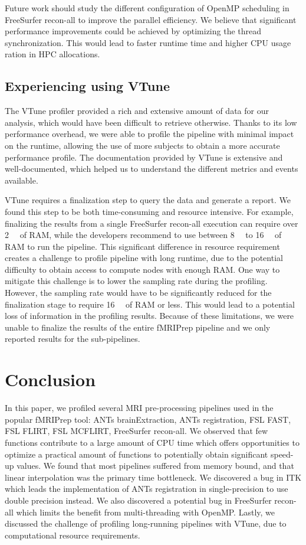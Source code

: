 \documentclass[conference]{IEEEtran}
\begin{document}
Future work should study the different configuration of OpenMP scheduling in FreeSurfer recon-all to improve the parallel efficiency. We believe that significant performance improvements could be achieved by optimizing the thread synchronization. This would lead to faster runtime time and higher CPU usage ration in HPC allocations.

\subsection{Experiencing using VTune}
The VTune profiler provided a rich and extensive amount of data for our analysis, which would have been difficult to retrieve otherwise. Thanks to its low performance overhead, we were able to profile the pipeline with minimal impact on the runtime, allowing the use of more subjects to obtain a more accurate performance profile. The documentation provided by VTune is extensive and well-documented, which helped us to understand the different metrics and events available.

VTune requires a finalization step to query the data and generate a report. We found this step to be both time-consuming and resource intensive. For example, finalizing the results from a single FreeSurfer recon-all execution can require over \SI{2}{\tera\byte} of RAM, while the developers recommend to use between \SI{8}{\giga\byte} to \SI{16}{\giga\byte} of RAM to run the pipeline. This significant difference in resource requirement creates a challenge to profile pipeline with long runtime, due to the potential difficulty to obtain access to compute nodes with enough RAM. One way to mitigate this challenge is to lower the sampling rate during the profiling. However, the sampling rate would have to be significantly reduced for the finalization stage to require  \SI{16}{\giga\byte} of RAM or less. This would lead to a potential loss of information in the profiling results.
Because of these limitations, we were unable to finalize the results of the entire fMRIPrep pipeline and we only reported results for the sub-pipelines.

\section{Conclusion}
In this paper, we profiled several MRI pre-processing pipelines used in the popular fMRIPrep tool: ANTs brainExtraction, ANTs registration, FSL FAST, FSL FLIRT, FSL MCFLIRT, FreeSurfer recon-all. We observed that few functions contribute to a large amount of CPU time which offers opportunities to optimize a practical amount of functions to potentially obtain significant speed-up values. We found that most pipelines suffered from memory bound, and that linear interpolation was the primary time bottleneck. We discovered a bug in ITK which leads the implementation of ANTs registration in single-precision to use double precision instead. We also discovered a potential bug in FreeSurfer recon-all which limits the benefit from multi-threading with OpenMP. Lastly, we discussed the challenge of profiling long-running pipelines with VTune, due to computational resource requirements.
\end{document}
